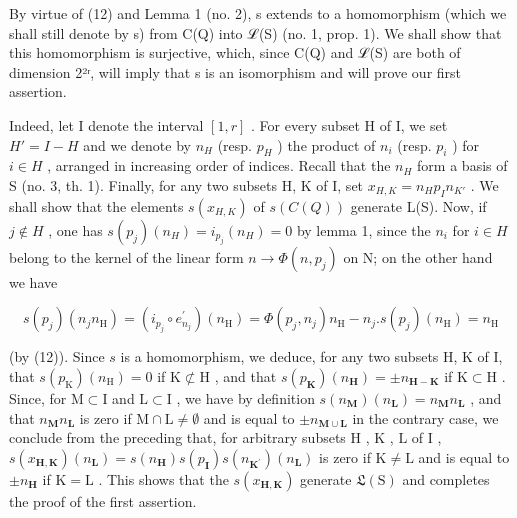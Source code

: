 By virtue of (12) and Lemma 1 (no. 2), s extends to a homomorphism (which we shall still denote by s) from C(Q) into ℒ(S) (no. 1, prop. 1). We shall show that this homomorphism is surjective, which, since C(Q) and ℒ(S) are both of dimension 2²ʳ, will imply that s is an isomorphism and will prove our first assertion.

Indeed, let I denote the interval \([1, r]\) . For every subset H of I, we set \(H' = I - H\) and we denote by \(n_{H}\) (resp. \(p_{H}\) ) the product of \(n_{i}\) (resp. \(p_{i}\) ) for \(i \in H\) , arranged in increasing order of indices. Recall that the \(n_{H}\) form a basis of S (no. 3, th. 1). Finally, for any two subsets H, K of I, set \(x_{H,K} = n_{H}p_{I}n_{K'}\) . We shall show that the elements \(s(x_{H,K})\) of \(s(C(Q))\) generate L(S). Now, if \(j \notin H\) , one has \(s(p_{j})(n_{H}) = i_{p_{j}}(n_{H}) = 0\) by lemma 1, since the \(n_{i}\) for \(i \in H\) belong to the kernel of the linear form \(n \to \Phi(n, p_{j})\) on N; on the other hand we have

\[
s \left(p _ {j}\right) \left(n _ {j} n _ {\mathrm{H}}\right) = \left(i _ {p _ {j}} \circ e _ {n _ {j}} ^ {\prime}\right) \left(n _ {\mathrm{H}}\right) = \Phi \left(p _ {j}, n _ {j}\right) n _ {\mathrm{H}} - n _ {j}. s \left(p _ {j}\right) \left(n _ {\mathrm{H}}\right) = n _ {\mathrm{H}}
\]

(by (12)). Since \(s\) is a homomorphism, we deduce, for any two subsets H, K of I, that \(s(p_{\mathrm{K}})(n_{\mathrm{H}}) = 0\) if \(\mathrm{K} \not\subset \mathrm{H}\) , and that \(s(p_{\mathbf{K}}) (n_{\mathbf{H}}) = \pm n_{\mathbf{H} - \mathbf{K}}\) if \(\mathrm{K} \subset \mathrm{H}\) . Since, for \(\mathrm{M} \subset \mathrm{I}\) and \(\mathrm{L} \subset \mathrm{I}\) , we have by definition \(s(n_{\mathbf{M}})(n_{\mathbf{L}}) = n_{\mathbf{M}}n_{\mathbf{L}}\) , and that \(n_{\mathbf{M}}n_{\mathbf{L}}\) is zero if \(\mathrm{M} \cap \mathrm{L} \neq \emptyset\) and is equal to \(\pm n_{\mathbf{M} \cup \mathbf{L}}\) in the contrary case, we conclude from the preceding that, for arbitrary subsets \(\mathrm{H}\) , \(\mathrm{K}\) , \(\mathrm{L}\) of \(\mathrm{I}\) , \(s(x_{\mathbf{H},\mathbf{K}})(n_{\mathbf{L}}) = s(n_{\mathbf{H}})s(p_{\mathbf{I}})s(n_{\mathbf{K}^{\prime}})(n_{\mathbf{L}})\) is zero if \(\mathrm{K} \neq \mathrm{L}\) and is equal to \(\pm n_{\mathbf{H}}\) if \(\mathrm{K} = \mathrm{L}\) . This shows that the \(s(x_{\mathbf{H},\mathbf{K}})\) generate \(\mathfrak{L}(\mathrm{S})\) and completes the proof of the first assertion.

